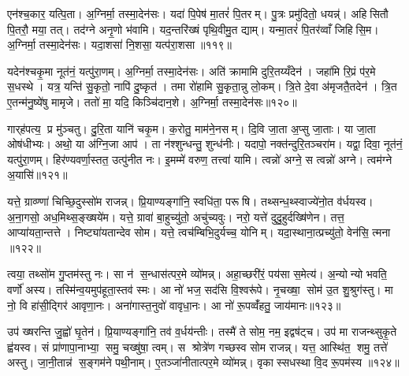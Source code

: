 एन॑श्च॒कार॒ यत्पि॒ता। अ॒ग्निर्मा॒ तस्मा॒देन॑सः। यदा॑ पि॒पेष॑ मा॒तरं॑ पि॒तरम्। पु॒त्रः प्रमु॑दितो॒ धयन्न्॑। अहिसितौ पि॒तरौ॒ मया॒ तत्। तद॑ग्ने अनृ॒णो भ॑वामि। यद॒न्तरि॑ख्षं पृथि॒वीमु॒त द्याम्। यन्मा॒तरं॑ पि॒तर॑व्वाँ जिहिसि॒म। अ॒ग्निर्मा॒ तस्मा॒देन॑सः। यदा॒शसा॑ नि॒शसा॒ यत्प॑रा॒शसा॥११९॥

यदेन॑श्चकृ॒मा नूत॑नं॒ यत्पु॑रा॒णम्। अ॒ग्निर्मा॒ तस्मा॒देन॑सः। अति॑ क्रामामि दुरि॒तय्यँदेन॑। जहा॑मि रि॒प्रं प॑र॒मे स॒धस्थे। यत्र॒ यन्ति॑ सु॒कृतो॒ नापि॑ दु॒ष्कृत॑। तमा रो॑हामि सु॒कृता॒न्नु लो॒कम्। त्रि॒ते दे॒वा अ॑मृजतै॒तदेन॑। त्रि॒त ए॒तन्म॑नु॒ष्ये॑षु मामृजे। ततो॑ मा॒ यदि॒ किञ्चि॑दान॒शे। अ॒ग्निर्मा॒ तस्मा॒देन॑सः॥१२०॥

गार्‌ह॑पत्य॒ प्र मु॑ञ्चतु। दु॒रि॒ता यानि॑ चकृ॒म। क॒रोतु॒ माम॑ने॒नसम्। दि॒वि जा॒ता अ॒प्सु जा॒ताः। या जा॒ता ओष॑धीभ्यः। अथो॒ या अ॑ग्नि॒जा आप॑। ता न॑श्शुन्धन्तु॒ शुन्ध॑नीः। यदापो॒ नक्त॑न्दुरि॒तञ्चरा॑म। यद्वा॒ दिवा॒ नूत॑नं॒ यत्पु॑रा॒णम्। हिर॑ण्यवर्णा॒स्तत॒ उत्पु॑नीत नः। इ॒मम्मे॑ वरुण॒ तत्त्वा॑ यामि। त्वन्नो॑ अग्ने॒ स त्वन्नो॑ अग्ने। त्वम॑ग्ने अ॒यासि॑॥१२१॥\anuvakamend[अ॒ने॒नस॑मष्ठी॒वद्भ्या स॒ति प॑रा॒शसा॑ऽऽन॒शेऽग्निर्मा॒ तस्मा॒देन॑सः पुनीत न॒स्त्रीणि॑ च (यद्दे॑वा॒ देवा॑ ऋ॒तेन॑ सजातश॒साद्यद्वा॒चा यद्धस्ताभ्या॒मदीव्यं॒ यन्मयि॑ मा॒ता यदा॑ पि॒पेष॒ यद॒न्तरि॑ख्षं॒ यदा॒शसाऽति॑ क्रामामि त्रि॒ते दे॒वा दि॒वि जा॒ता अ॒प्सु जा॒ता यदाप॑ इ॒मम्मे॑ वरुण॒ तत्त्वा॑ यामि॒ त्वन्नो॑ अग्ने॒ स त्वन्नो॑ अग्ने॒ त्वम॑ग्ने अ॒यासि॑। )]

यत्ते॒ ग्राव्ण्णा॑ चिच्छि॒दुस्सो॑म राजन्न्। प्रि॒याण्यङ्गा॑नि॒ स्वधि॑ता॒ परूषि। तथ्सन्ध॒थ्स्वाज्ये॑नो॒त व॑र्धयस्व। अ॒ना॒गसो॒ अध॒मिथ्स॒ङ्ख्षये॑म। यत्ते॒ ग्रावा॑ बा॒हुच्यु॑तो॒ अचु॑च्यवुः। नरो॒ यत्ते॑ दुदु॒हुर्दख्षि॑णेन। तत्त॒ आप्या॑यता॒न्तत्ते। निष्ट्या॑यतान्देव सोम। यत्ते॒ त्वच॑म्बिभि॒दुर्यच्च॒ योनिम्। यदा॒स्थाना॒त्प्रच्यु॑तो॒ वेन॑सि॒ त्मना ॥१२२॥

त्वया॒ तथ्सो॑म गु॒प्तम॑स्तु नः। सा न॑ स॒न्धास॑त्पर॒मे व्यो॑मन्न्। अहा॒च्छरी॑रं॒ पय॑सा स॒मेत्य॑। अ॒न्योन्यो भवति॒ वर्णो॑ अस्य। तस्मि॑न्व॒यमुप॑हूता॒स्तव॑ स्मः। आ नो॑ भज॒ सद॑सि वि॒श्वरू॑पे। नृ॒चख्षा॒ सोम॑ उ॒त शु॒श्रुग॑स्तु। मा नो॒ वि हा॑सी॒द्गिर॑ आवृणा॒नः। अना॑गास्त॒नुवो॑ वावृधा॒नः। आ नो॑ रू॒पव्वँ॑हतु॒ जाय॑मानः॥१२३॥

उप॑ ख्षरन्ति जु॒ह्वो॑ घृ॒तेन॑। प्रि॒याण्यङ्गा॑नि॒ तव॑ व॒र्धय॑न्तीः। तस्मै॑ ते सोम॒ नम॒ इद्वष॑ट्च। उप॑ मा राजन्थ्सुकृ॒ते ह्व॑यस्व। सं प्रा॑णापा॒नाभ्या॒ समु॒ चख्षु॑षा॒ त्वम्। स श्रोत्रे॑ण गच्छस्व सोम राजन्न्। यत्त॒ आस्थि॑त॒ शमु॒ तत्ते॑ अस्तु। जा॒नी॒तान्न॑ स॒ङ्गम॑ने पथी॒नाम्। ए॒तञ्जा॑नीतात्पर॒मे व्यो॑मन्न्। वृकास्सधस्था वि॒द रू॒पम॑स्य ॥१२४॥

